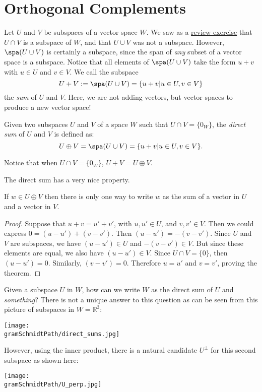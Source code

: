 \section{Orthogonal Complements}

Let $U$ and $V$ be subspaces of a vector space $W$.  We saw as a \hyperref[UcapV]{review exercise} that $U\cap V$ is a subspace of $W$, and that $U\cup V$ was not a subspace.  However, $\spa (U\cup V)$ is certainly a subspace, since the span of \emph{any} subset of a vector space is a subspace.
Notice that all elements of $\spa (U\cup V)$ take the form $u+v$ with $u\in U$ and $v\in V$.  We call the subspace 
\[
U+V:=\spa (U\cup V) = \{u+v | u\in U, v\in V \}
\] 
the \emph{sum} of $U$ and $V$.  Here, we are not adding vectors, but vector spaces to produce a new vector space!


\begin{definition}
Given two subspaces $U$ and $V$ of a space $W$ such that $U\cap V=\{0_W\}$, the \emph{direct sum} of $U$ and $V$ is defined as:
\[
U \oplus V = \spa (U\cup V)= \{u+v | u\in U, v\in V \}.
\]
\end{definition}
Notice that when $U\cap V= \{0_W\}$, $U+V=U\oplus V$.


The direct sum has a very nice property.

\begin{theorem}
If $w\in U\oplus V$  then 
there is only one way to write \(w\) as the sum of a vector in \(U\) and a vector in \(V\).  
\end{theorem}

\begin{proof}
Suppose that $u+v=u'+v'$, with $u,u'\in U$, and $v,v' \in V$.  Then we could express $0=(u-u')+(v-v')$.  Then $(u-u')=-(v-v')$.  Since $U$ and $V$ are subspaces, we have $(u-u')\in U$ and $-(v-v')\in V$.  But since these elements are equal, we also have $(u-u')\in V$.  Since $U\cap V=\{0\}$, then $(u-u')=0$.  Similarly, $(v-v')=0$. Therefore $u=u'$ and  $v=v'$, proving the theorem. 
\end{proof}


Given a subspace $U$ in $W$, how can we write $W$ as the direct sum of $U$ and \emph{something}? There is not a unique answer to this question as can be seen from this picture of subspaces in $W={\mathbb R}^3$: 
\begin{center}
\texttt{[image: \\gramSchmidtPath/direct\_sums.jpg]}
\end{center}
However, using the inner product, there is a natural candidate $U^\perp$ for this second subspace as shown here:
\begin{center}
\texttt{[image: \\gramSchmidtPath/U\_perp.jpg]}
\end{center}

